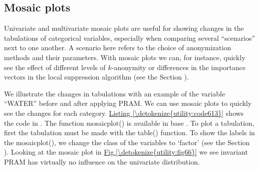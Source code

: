 \documentclass[letterpaper,10pt,english]{sphinxmanual}
\begin{document}
\subsection{Mosaic plots}
\label{\detokenize{utility:mosaic-plots}}
Univariate and multivariate mosaic plots are useful for showing changes
in the tabulations of categorical variables, especially when comparing
several “scenarios” next to one another. A scenario here refers to the
choice of anonymization methods and their parameters. With mosaic plots
we can, for instance, quickly see the effect of different levels of
\(k\)-anonymity or differences in the importance vectors in the
local suppression algorithm (see the Section ).

We illustrate the changes in tabulations with an example of the variable
“WATER” before and after applying PRAM. We can use mosaic plots to
quickly see the changes for each category. \hyperref[\detokenize{utility:code613}]{Listing \ref{\detokenize{utility:code613}}} shows the code
in . The function mosaicplot() is available in base . To plot a
tabulation, first the tabulation must be made with the table() function.
To show the labels in the mosaicplot(), we change the class of the
variables to ‘factor’ (see the Section
). Looking at
the mosaic plot in \hyperref[\detokenize{utility:fig66}]{Fig.\@ \ref{\detokenize{utility:fig66}}} we see invariant PRAM has virtually no
influence on the univariate distribution.
\end{document}
